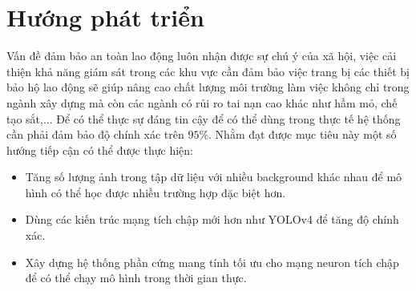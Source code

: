 \section{Hướng phát triển}
Vấn đề đảm bảo an toàn lao động luôn nhận được sự chú ý của xã hội, việc cải thiện khả năng giám sát trong các khu vực cần đảm bảo việc trang bị các thiết bị bảo hộ lao động sẽ giúp nâng cao chất lượng môi trường làm việc không chỉ trong ngành xây dựng mà còn các ngành có rủi ro tai nạn cao khác như hầm mỏ, chế tạo sắt,... Để có thể thực sự đáng tin cậy để có thể dùng trong thực tế hệ thống cần phải đảm bảo độ chính xác trên $95\%$. Nhằm đạt được mục tiêu này một số hướng tiếp cận có thể được thực hiện:
\begin{itemize}
	\item Tăng số lượng ảnh trong tập dữ liệu với nhiều background khác nhau để mô hình có thể học được nhiều trường hợp đặc biệt hơn.
	\item Dùng các kiến trúc mạng tích chập mới hơn như YOLOv4 để tăng độ chính xác.
	\item Xây dựng hệ thống phần cứng mang tính tối ưu cho mạng neuron tích chập để có thể chạy mô hình trong thời gian thực.
\end{itemize}
